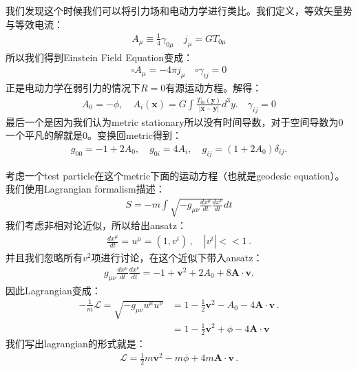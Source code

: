 我们发现这个时候我们可以将引力场和电动力学进行类比。我们定义，等效矢量势与等效电流：
\begin{align}
  A_\mu\equiv\frac{1}{4}\gamma_{0\mu} \quad j_{\mu}=GT_{0\mu}
\end{align}
所以我们得到Einstein Field Equation变成：
\begin{align}
  \square A_\mu = -4\pi j_\mu \quad \square \gamma_{ij} = 0
\end{align}
正是电动力学在弱引力的情况下$ R = 0 $有源运动方程。解得：
\begin{align}
  A_0=-\phi,\quad
  A_i(\mathbf{x})=G\int\frac{T_{0i}(\mathbf{y})}{|\mathbf{x}-\mathbf{y}|}d^3y.\quad
  \gamma_{ij}=0
\end{align}
最后一个是因为我们认为metric stationary所以没有时间导数，对于空间导数为0一个平凡的解就是0。变换回metric得到：
\begin{align}
  g_{00}=-1+2A_0,\quad g_{0i}=4A_i,\quad g_{ij}=(1+2A_0)\delta_{ij}.
\end{align}

\bigskip
{}

考虑一个test particle在这个metric下面的运动方程（也就是geodesic
equation）。我们使用Lagrangian formalism描述：
\begin{align}
  S = - m \int\sqrt{-g_{\mu\nu}\frac{dx^\mu}{dt}\frac{dx^\nu}{dt}}dt
\end{align}
我们考虑非相对论近似，所以给出ansatz：
\begin{align}
  \displaystyle\frac{d x^\mu}{d t} = u^\mu = (1, v^i) \, , \quad |v^i| << 1 \, .
\end{align}
并且我们忽略所有$ v^2 $项进行讨论，在这个近似下带入ansatz：
\begin{align}
  g_{\mu\nu}\frac{dx^\mu}{dt}\frac{dx^\nu}{dt}=-1+\mathbf{v}^2+2A_0+8\mathbf{A}\cdot\mathbf{v}.
\end{align}
因此Lagrangian变成：
\begin{align}
  - \displaystyle\frac{1}{m}\mathcal{L} = \sqrt{-g_{\mu\nu} u^\mu
  u^\nu} & = 1- \displaystyle\frac{1}{2} \mathbf{v}^2 - A_0 - 4
  \mathbf{A} \cdot \mathbf{v} \, .\\
  &= 1- \displaystyle\frac{1}{2} \mathbf{v}^2 +\phi - 4 \mathbf{A}
  \cdot \mathbf{v}
\end{align}
我们写出lagrangian的形式就是：
\begin{align}
  \mathcal{L} = \displaystyle\frac{1}{2} m \mathbf{v}^2 - m \phi + 4
  m \mathbf{A} \cdot \mathbf{v} \, .
\end{align}

